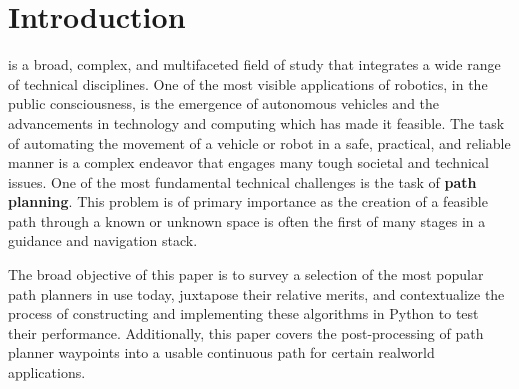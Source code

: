 \section{Introduction}

 is a broad, complex, and multifaceted field of study that integrates a wide range of technical disciplines. One of the most visible applications of robotics, in the public consciousness, is the emergence of autonomous vehicles and the advancements in technology and computing which has made it feasible. The task of automating the movement of a vehicle or robot in a safe, practical, and reliable manner is a complex endeavor that engages many tough societal and technical issues. One of the most fundamental technical challenges is the task of \textbf{path planning}. This problem is of primary importance as the creation of a feasible path through a known or unknown space is often the first of many stages in a guidance and navigation stack.

The broad objective of this paper is to survey a selection of the most popular path planners in use today, juxtapose their relative merits, and contextualize the process of constructing and implementing these algorithms in Python to test their performance. Additionally, this paper covers the post-processing of path planner waypoints into a usable continuous path for certain realworld applications.   
